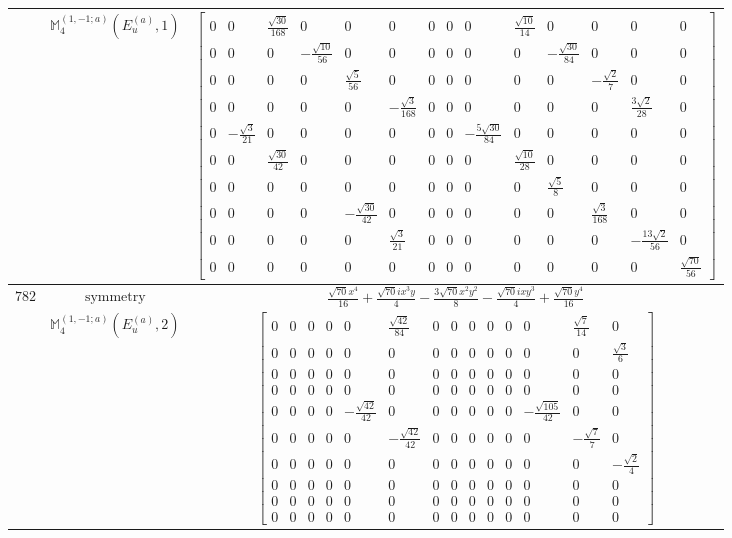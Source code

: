 \documentclass[fleqn,8pt,landscape]{jsarticle}
\begin{document}
\begin{longtable}{ccc}
$  $ & $ \mathbb{M}_{4}^{(1,-1;a)}(E_{u}^{(a)},1) $ & $ \begin{bmatrix} 0 & 0 & \frac{\sqrt{30}}{168} & 0 & 0 & 0 & 0 & 0 & 0 & \frac{\sqrt{10}}{14} & 0 & 0 & 0 & 0 \\ 0 & 0 & 0 & - \frac{\sqrt{10}}{56} & 0 & 0 & 0 & 0 & 0 & 0 & - \frac{\sqrt{30}}{84} & 0 & 0 & 0 \\ 0 & 0 & 0 & 0 & \frac{\sqrt{5}}{56} & 0 & 0 & 0 & 0 & 0 & 0 & - \frac{\sqrt{2}}{7} & 0 & 0 \\ 0 & 0 & 0 & 0 & 0 & - \frac{\sqrt{3}}{168} & 0 & 0 & 0 & 0 & 0 & 0 & \frac{3 \sqrt{2}}{28} & 0 \\ 0 & - \frac{\sqrt{3}}{21} & 0 & 0 & 0 & 0 & 0 & 0 & - \frac{5 \sqrt{30}}{84} & 0 & 0 & 0 & 0 & 0 \\ 0 & 0 & \frac{\sqrt{30}}{42} & 0 & 0 & 0 & 0 & 0 & 0 & \frac{\sqrt{10}}{28} & 0 & 0 & 0 & 0 \\ 0 & 0 & 0 & 0 & 0 & 0 & 0 & 0 & 0 & 0 & \frac{\sqrt{5}}{8} & 0 & 0 & 0 \\ 0 & 0 & 0 & 0 & - \frac{\sqrt{30}}{42} & 0 & 0 & 0 & 0 & 0 & 0 & \frac{\sqrt{3}}{168} & 0 & 0 \\ 0 & 0 & 0 & 0 & 0 & \frac{\sqrt{3}}{21} & 0 & 0 & 0 & 0 & 0 & 0 & - \frac{13 \sqrt{2}}{56} & 0 \\ 0 & 0 & 0 & 0 & 0 & 0 & 0 & 0 & 0 & 0 & 0 & 0 & 0 & \frac{\sqrt{70}}{56} \end{bmatrix} $ \\ \hline
$ 782 $ & $ \text{symmetry} $ & $ \frac{\sqrt{70} x^{4}}{16} + \frac{\sqrt{70} i x^{3} y}{4} - \frac{3 \sqrt{70} x^{2} y^{2}}{8} - \frac{\sqrt{70} i x y^{3}}{4} + \frac{\sqrt{70} y^{4}}{16} $ \\
$  $ & $ \mathbb{M}_{4}^{(1,-1;a)}(E_{u}^{(a)},2) $ & $ \begin{bmatrix} 0 & 0 & 0 & 0 & 0 & \frac{\sqrt{42}}{84} & 0 & 0 & 0 & 0 & 0 & 0 & \frac{\sqrt{7}}{14} & 0 \\ 0 & 0 & 0 & 0 & 0 & 0 & 0 & 0 & 0 & 0 & 0 & 0 & 0 & \frac{\sqrt{3}}{6} \\ 0 & 0 & 0 & 0 & 0 & 0 & 0 & 0 & 0 & 0 & 0 & 0 & 0 & 0 \\ 0 & 0 & 0 & 0 & 0 & 0 & 0 & 0 & 0 & 0 & 0 & 0 & 0 & 0 \\ 0 & 0 & 0 & 0 & - \frac{\sqrt{42}}{42} & 0 & 0 & 0 & 0 & 0 & 0 & - \frac{\sqrt{105}}{42} & 0 & 0 \\ 0 & 0 & 0 & 0 & 0 & - \frac{\sqrt{42}}{42} & 0 & 0 & 0 & 0 & 0 & 0 & - \frac{\sqrt{7}}{7} & 0 \\ 0 & 0 & 0 & 0 & 0 & 0 & 0 & 0 & 0 & 0 & 0 & 0 & 0 & - \frac{\sqrt{2}}{4} \\ 0 & 0 & 0 & 0 & 0 & 0 & 0 & 0 & 0 & 0 & 0 & 0 & 0 & 0 \\ 0 & 0 & 0 & 0 & 0 & 0 & 0 & 0 & 0 & 0 & 0 & 0 & 0 & 0 \\ 0 & 0 & 0 & 0 & 0 & 0 & 0 & 0 & 0 & 0 & 0 & 0 & 0 & 0 \end{bmatrix} $ \\ \hline

\end{longtable}
\end{document}
